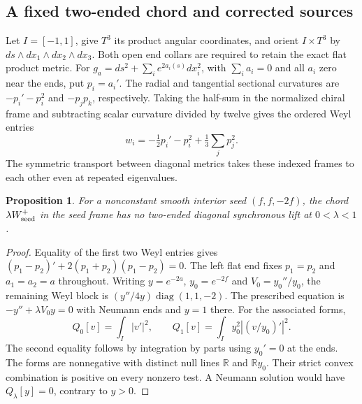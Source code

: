 \documentclass[11pt]{article}
\numberwithin{equation}{section}
\newtheorem{proposition}[theorem]{Proposition}
\theoremstyle{definition}
\theoremstyle{remark}
\begin{document}
\subsection{A fixed two-ended chord and corrected sources}

Let \(I=[-1,1]\), give \(T^3\) its product angular coordinates, and
orient \(I\times T^3\) by \(ds\wedge dx_1\wedge dx_2\wedge dx_3\).
Both open end collars are required to retain the exact flat product metric. For
\(g_a=ds^2+\sum_i e^{2a_i(s)}dx_i^2\), with \(\sum_i a_i=0\) and
all \(a_i\) zero near the ends, put \(p_i=a_i'\).
The radial and tangential sectional curvatures are
\(-p_i'-p_i^2\) and \(-p_jp_k\), respectively. Taking the half-sum
in the normalized chiral frame and subtracting scalar curvature divided
by twelve gives the ordered Weyl entries
\[
 w_i=-\tfrac12p_i'-p_i^2+\tfrac13\sum_j p_j^2.
\]
The symmetric transport between diagonal metrics takes these indexed
frames to each other even at repeated eigenvalues.

\begin{proposition}\label{bdry:axial-chord}
For a nonconstant smooth interior seed \((f,f,-2f)\), the chord
\(\lambda W_{\rm seed}^+\) in the seed frame has no two-ended
diagonal synchronous lift at \(0<\lambda<1\).
\end{proposition}
\begin{proof}
Equality of the first two Weyl entries gives
\((p_1-p_2)'+2(p_1+p_2)(p_1-p_2)=0\).
The left flat end fixes \(p_1=p_2\) and \(a_1=a_2=a\) throughout.
Writing \(y=e^{-2a}\), \(y_0=e^{-2f}\) and \(V_0=y_0''/y_0\), the
remaining Weyl block is \((y''/4y)\operatorname{diag}(1,1,-2)\).
The prescribed equation is \(-y''+\lambda V_0y=0\) with Neumann
ends and \(y=1\) there. For the associated forms,
\[
 Q_0[v]=\int_I|v'|^2,\qquad
 Q_1[v]=\int_I y_0^2|(v/y_0)'|^2.
\]
The second equality follows by integration by parts using
\(y_0'=0\) at the ends. The forms are nonnegative with distinct
null lines \(\mathbb R\) and \(\mathbb R y_0\). Their strict convex
combination is positive on every nonzero test. A Neumann solution
would have \(Q_\lambda[y]=0\), contrary to \(y>0\).
\end{proof}
\end{document}
